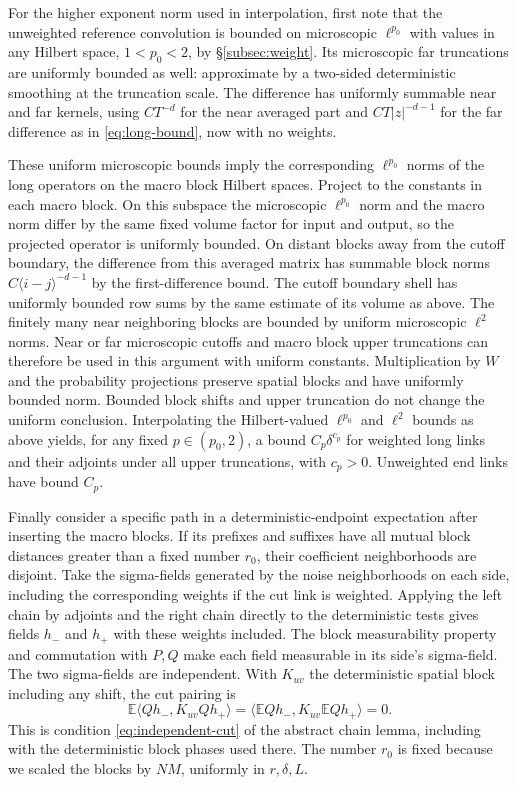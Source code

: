 \documentclass[11pt]{article}
\begin{document}
For the higher exponent norm used in interpolation, first note that the unweighted reference convolution is bounded on microscopic \(\ell^{p_0}\) with values in any Hilbert space, \(1<p_0<2\), by \S\ref{subsec:weight}. Its microscopic far truncations are uniformly bounded as well: approximate by a two-sided deterministic smoothing at the truncation scale. The difference has uniformly summable near and far kernels, using \(CT^{-d}\) for the near averaged part and \(CT|z|^{-d-1}\) for the far difference as in \eqref{eq:long-bound}, now with no weights.

These uniform microscopic bounds imply the corresponding \(\ell^{p_0}\) norms of the long operators on the macro block Hilbert spaces. Project to the constants in each macro block. On this subspace the microscopic \(\ell^{p_0}\) norm and the macro norm differ by the same fixed volume factor for input and output, so the projected operator is uniformly bounded. On distant blocks away from the cutoff boundary, the difference from this averaged matrix has summable block norms \(C\langle i-j\rangle^{-d-1}\) by the first-difference bound. The cutoff boundary shell has uniformly bounded row sums by the same estimate of its volume as above. The finitely many near neighboring blocks are bounded by uniform microscopic \(\ell^2\) norms. Near or far microscopic cutoffs and macro block upper truncations can therefore be used in this argument with uniform constants. Multiplication by \(W\) and the probability projections preserve spatial blocks and have uniformly bounded norm. Bounded block shifts and upper truncation do not change the uniform conclusion. Interpolating the Hilbert-valued \(\ell^{p_0}\) and \(\ell^2\) bounds as above yields, for any fixed \(p\in(p_0,2)\), a bound \(C_p\delta^{c_p}\) for weighted long links and their adjoints under all upper truncations, with \(c_p>0\). Unweighted end links have bound \(C_p\).

Finally consider a specific path in a deterministic-endpoint expectation after inserting the macro blocks. If its prefixes and suffixes have all mutual block distances greater than a fixed number \(r_0\), their coefficient neighborhoods are disjoint. Take the sigma-fields generated by the noise neighborhoods on each side, including the corresponding weights if the cut link is weighted. Applying the left chain by adjoints and the right chain directly to the deterministic tests gives fields \(h_-\) and \(h_+\) with these weights included. The block measurability property and commutation with \(P,Q\) make each field measurable in its side's sigma-field. The two sigma-fields are independent. With \(K_{uv}\) the deterministic spatial block including any shift, the cut pairing is
\[
 \mathbb E\langle Qh_-,K_{uv}Qh_+\rangle
   =\langle\mathbb E Qh_-,K_{uv}\mathbb E Qh_+\rangle=0 .
\] This is condition \eqref{eq:independent-cut} of the abstract chain lemma, including with the deterministic block phases used there. The number \(r_0\) is fixed because we scaled the blocks by \(NM\), uniformly in \(r,\delta,L\).
\end{document}
